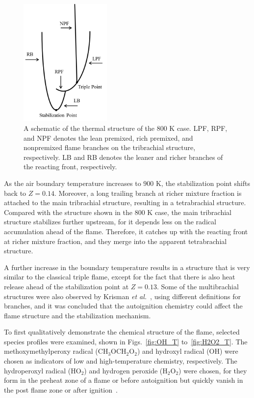 \begin{figure}[t]
  \centering
  \scriptsize
  \includegraphics[width=0.4\textwidth]{ch-dynamics/schematic_800.png}
  \normalsize
  \caption{A schematic of the thermal structure of the $800$ K case.  LPF, RPF, and NPF denotes the lean premixed, rich premixed, and nonpremixed flame branches on the tribrachial structure, respectively.  LB and RB denotes the leaner and richer branches of the reacting front, respectively.}
  \label{fig:schematic_800}
\end{figure}

As the air boundary temperature increases to $900$ K, the stabilization point shifts back to $Z = 0.14$.  Moreover, a long trailing branch at richer mixture fraction is attached to the main tribrachial structure, resulting in a tetrabrachial structure.  Compared with the structure shown in the $800$ K case, the main tribrachial structure stabilizes further upstream, for it depends less on the radical accumulation ahead of the flame.  Therefore, it catches up with the reacting front at richer mixture fraction, and they merge into the apparent tetrabrachial structure.

A further increase in the boundary temperature results in a structure that is very similar to the classical triple flame, except for the fact that there is also heat release ahead of the stabilization point at $Z = 0.13$.  Some of the multibrachial structures were also observed by Krisman \emph{et al.}~\cite{krisman15}, using different definitions for branches, and it was concluded that the autoignition chemistry could affect the flame structure and the stabilization mechanism.  

To first qualitatively demonstrate the chemical structure of the flame, selected species profiles were examined, shown in Figs.~\ref{fig:OH_T} to~\ref{fig:H2O2_T}.  The methoxymethylperoxy radical (CH$_3$OCH$_2$O$_2$) and hydroxyl radical (OH) were chosen as indicators of low and high-temperature chemistry, respectively.  The hydroperoxyl radical (HO$_2$) and hydrogen peroxide (H$_2$O$_2$) were chosen, for they form in the preheat zone of a flame or before autoignition but quickly vanish in the post flame zone or after ignition~\cite{yoo09}.

